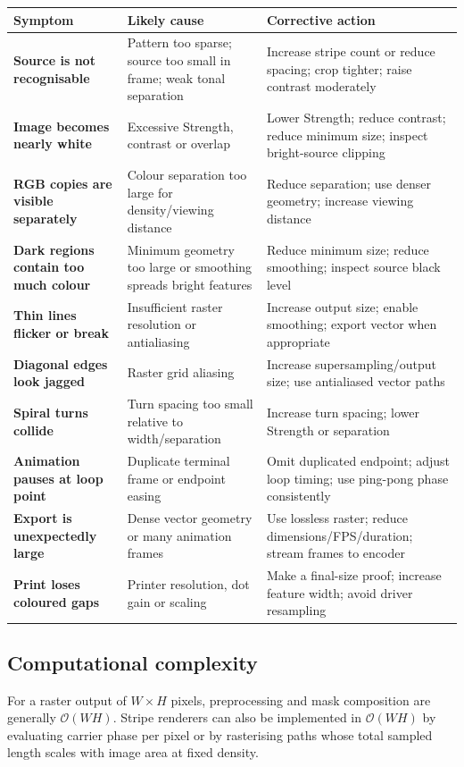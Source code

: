 \begin{tabularx}{\textwidth}{>{\bfseries}p{} >{\raggedright\arraybackslash}X >{\raggedright\arraybackslash}X}
\toprule
Symptom & Likely cause & Corrective action \\
\midrule
Source is not recognisable & Pattern too sparse; source too small in frame; weak tonal separation & Increase stripe count or reduce spacing; crop tighter; raise contrast moderately \\
Image becomes nearly white & Excessive Strength, contrast or overlap & Lower Strength; reduce contrast; reduce minimum size; inspect bright-source clipping \\
RGB copies are visible separately & Colour separation too large for density/viewing distance & Reduce separation; use denser geometry; increase viewing distance \\
Dark regions contain too much colour & Minimum geometry too large or smoothing spreads bright features & Reduce minimum size; reduce smoothing; inspect source black level \\
Thin lines flicker or break & Insufficient raster resolution or antialiasing & Increase output size; enable smoothing; export vector when appropriate \\
Diagonal edges look jagged & Raster grid aliasing & Increase supersampling/output size; use antialiased vector paths \\
Spiral turns collide & Turn spacing too small relative to width/separation & Increase turn spacing; lower Strength or separation \\
Animation pauses at loop point & Duplicate terminal frame or endpoint easing & Omit duplicated endpoint; adjust loop timing; use ping-pong phase consistently \\
Export is unexpectedly large & Dense vector geometry or many animation frames & Use lossless raster; reduce dimensions/FPS/duration; stream frames to encoder \\
Print loses coloured gaps & Printer resolution, dot gain or scaling & Make a final-size proof; increase feature width; avoid driver resampling \\
\bottomrule
\end{tabularx}

\subsection{Computational complexity}

For a raster output of $W\times H$ pixels, preprocessing and mask composition are generally $\mathcal{O}(WH)$. Stripe renderers can also be implemented in $\mathcal{O}(WH)$ by evaluating carrier phase per pixel or by rasterising paths whose total sampled length scales with image area at fixed density.

